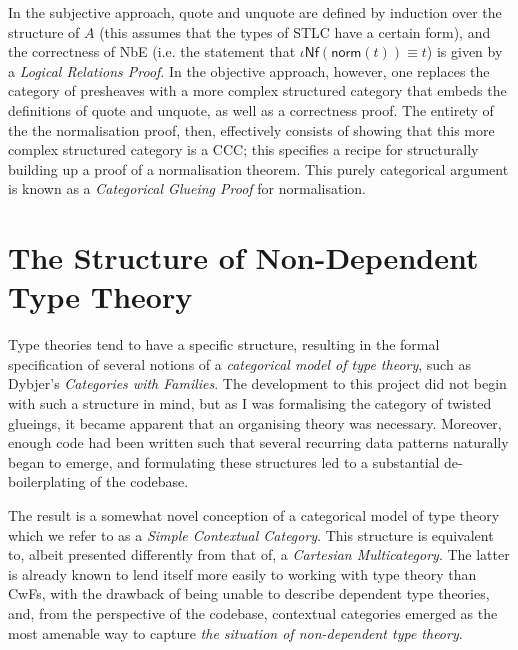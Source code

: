 \documentclass{article}[9pt]
\newcommand{\bkt}[1]{\left(#1\right)}
\begin{document}
In the subjective approach, quote and unquote are defined by induction over the
structure of $A$ (this assumes that the types of STLC have a certain form), and
the correctness of NbE (i.e. the statement that $\iota\mathsf{Nf}
\bkt{\mathsf{norm} \bkt{t}} \equiv t$) is given by a \emph{Logical Relations
Proof}. In the objective approach, however, one replaces the category of
presheaves with a more complex structured category that embeds the definitions
of quote and unquote, as well as a correctness proof. The entirety of the the
normalisation proof, then, effectively consists of showing that this more
complex structured category is a CCC; this specifies a recipe for structurally
building up a proof of a normalisation theorem. This purely categorical argument
is known as a \emph{Categorical Glueing Proof} for normalisation.
\fi

\section{The Structure of Non-Dependent Type Theory}

Type theories tend to have a specific structure, resulting in the formal
specification of several notions of a \emph{categorical model of type theory},
such as Dybjer's \emph{Categories with Families}. The development to this
project did not begin with such a structure in mind, but as I was formalising
the category of twisted glueings, it became apparent that an organising theory
was necessary. Moreover, enough code had been written such that several
recurring data patterns naturally began to emerge, and formulating these
structures led to a substantial de-boilerplating of the codebase.

The result is a somewhat novel conception of a categorical model of type theory
which we refer to as a \emph{Simple Contextual Category}. This structure is
equivalent to, albeit presented differently from that of, a \emph{Cartesian
Multicategory}. The latter is already known to lend itself more easily to
working with type theory than CwFs, with the drawback of being unable to
describe dependent type theories, and, from the perspective of the codebase,
contextual categories emerged as the most amenable way to capture \emph{the
situation of non-dependent type theory}.

\clearpage










\end{document}
